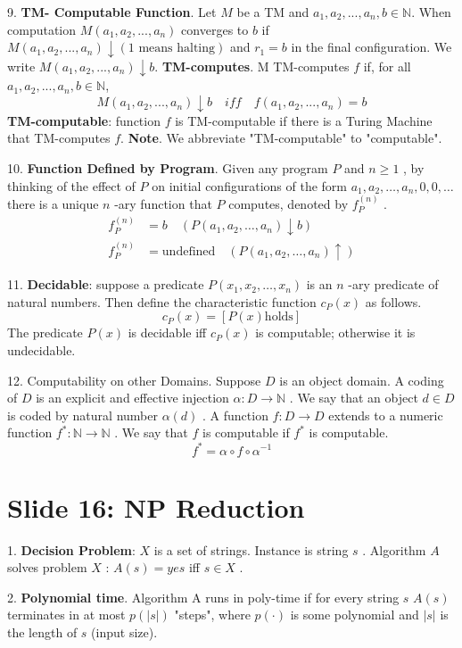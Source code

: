 \documentclass[10pt,a4paper]{article}
\begin{document}
9. \textbf{TM- Computable Function}.
Let \(M\) be a TM and \(a_1, a_2, ..., a_n, b \in \mathbb{N}\). When computation \(M(a_1,a_2,...,a_n)\) converges to \(b\) if \(M(a_1,a_2,...,a_n) \downarrow (1 \text{ means halting})\) and \(r_1 = b\) in the final configuration. We write \(M(a_1,a_2,...,a_n) \downarrow b\).
\textbf{TM-computes}. M TM-computes \(f\) if, for all \(a_1, a_2, ..., a_n, b \in \mathbb{N}\),
\[
M(a_1,a_2,...,a_n) \downarrow b \quad iff \quad f(a_1,a_2,...,a_n) = b
\]
\textbf{TM-computable}: function \(f\) is TM-computable if there is a Turing Machine that TM-computes \(f\).
\textbf{Note}. We abbreviate "TM-computable" to "computable".

10. \textbf{Function Defined by Program}. Given any program \(P\) and \(n\geq 1\) , by thinking of the effect of \(P\) on initial configurations of the form \(a_{1},a_{2},\ldots ,a_{n},0,0,\ldots\) there is a unique \(n\) -ary function that \(P\) computes, denoted by \(f_{P}^{(n)}\) .
\begin{align*}
f_{P}^{(n)} &= b \quad (P(a_{1},a_{2},\dots ,a_{n})\downarrow b) \\
f_{P}^{(n)} &= \text{undefined} \quad (P(a_{1},a_{2},\dots ,a_{n})\uparrow)
\end{align*}

11. \textbf{Decidable}: suppose a predicate \(P(x_{1},x_{2},\dots,x_{n})\) is an \(n\) -ary predicate of natural numbers. Then define the characteristic function \(c_{P}(x)\) as follows.
\[
c_{P}(x) = [P(x)\mathrm{holds}]
\]
The predicate \(P(x)\) is decidable iff \(c_{P}(x)\) is computable; otherwise it is undecidable.

12. Computability on other Domains. Suppose \(D\) is an object domain. A coding of \(D\) is an explicit and effective injection \(\alpha :D\to \mathbb{N}\) . We say that an object \(d\in D\) is coded by natural number \(\alpha (d)\) . A function \(f:D\to D\) extends to a numeric function \(f^{*}:\mathbb{N}\to \mathbb{N}\) . We say that \(f\) is computable if \(f^{*}\) is computable.
\[
f^{*} = \alpha \circ f\circ \alpha^{-1}
\]

\section*{Slide 16: NP Reduction}

1. \textbf{Decision Problem}: \(X\) is a set of strings. Instance is string \(s\) . Algorithm \(A\) solves problem \(X\) : \(A(s) = yes\) iff \(s\in X\) .

2. \textbf{Polynomial time}. Algorithm A runs in poly-time if for every string \(s\) \(A(s)\) terminates in at most \(p(|s|)\) "steps", where \(p(\cdot)\) is some polynomial and \(|s|\) is the length of \(s\) (input size).
\end{document}
